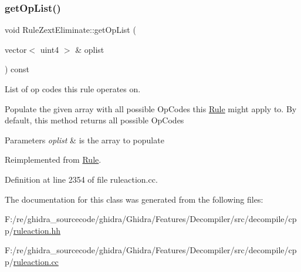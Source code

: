 \subsubsection{\texorpdfstring{getOpList()}{getOpList()}}
{\footnotesize\ttfamily void Rule\+Zext\+Eliminate\+::get\+Op\+List (\begin{DoxyParamCaption}\item[{vector$<$ uint4 $>$ \&}]{oplist }\end{DoxyParamCaption}) const\hspace{0.3cm}{\ttfamily [virtual]}}



List of op codes this rule operates on. 

Populate the given array with all possible Op\+Codes this \mbox{\hyperlink{class_rule}{Rule}} might apply to. By default, this method returns all possible Op\+Codes 
\begin{DoxyParams}{Parameters}
{\em oplist} & is the array to populate \\
\hline
\end{DoxyParams}


Reimplemented from \mbox{\hyperlink{class_rule_a4023bfc7825de0ab866790551856d10e}{Rule}}.



Definition at line 2354 of file ruleaction.\+cc.



The documentation for this class was generated from the following files\+:\begin{DoxyCompactItemize}
\item 
F\+:/re/ghidra\+\_\+sourcecode/ghidra/\+Ghidra/\+Features/\+Decompiler/src/decompile/cpp/\mbox{\hyperlink{ruleaction_8hh}{ruleaction.\+hh}}\item 
F\+:/re/ghidra\+\_\+sourcecode/ghidra/\+Ghidra/\+Features/\+Decompiler/src/decompile/cpp/\mbox{\hyperlink{ruleaction_8cc}{ruleaction.\+cc}}\end{DoxyCompactItemize}
